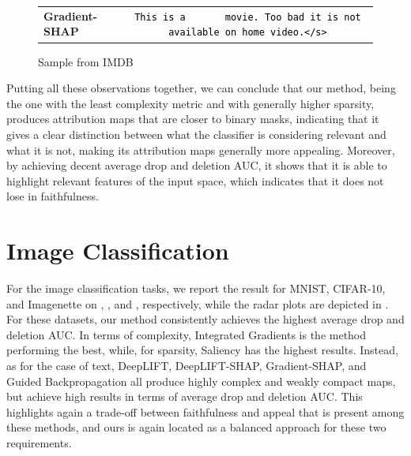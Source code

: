 \begin{figure}[t!]
{\begin{tabular}{lc}
    \textbf{Gradient-SHAP} & {\tt\colorbox[RGB]{251, 139, 88}{\textcolor{black}{\vphantom{Tg}This}} \colorbox[RGB]{254, 232, 200}{\textcolor{black}{\vphantom{Tg}is}} \colorbox[RGB]{253, 187, 133}{\textcolor{black}{\vphantom{Tg}a}} \colorbox[RGB]{127, 0, 0}{\textcolor{white}{\vphantom{Tg}great}} \colorbox[RGB]{217, 52, 34}{\textcolor{black}{\vphantom{Tg}movie.}} \colorbox[RGB]{248, 129, 84}{\textcolor{black}{\vphantom{Tg}Too}} \colorbox[RGB]{255, 247, 236}{\textcolor{black}{\vphantom{Tg}bad}} \colorbox[RGB]{253, 173, 119}{\textcolor{black}{\vphantom{Tg}it}} \colorbox[RGB]{253, 200, 146}{\textcolor{black}{\vphantom{Tg}is}} \colorbox[RGB]{253, 216, 167}{\textcolor{black}{\vphantom{Tg}not}} \colorbox[RGB]{244, 117, 79}{\textcolor{black}{\vphantom{Tg}available}} \colorbox[RGB]{245, 119, 80}{\textcolor{black}{\vphantom{Tg}on}} \colorbox[RGB]{244, 118, 79}{\textcolor{black}{\vphantom{Tg}home}} \colorbox[RGB]{253, 217, 170}{\textcolor{black}{\vphantom{Tg}video.</s>}}}\\
    \end{tabular}
    }
    \caption{Sample from IMDB} \label{fig:imdb_sample}
\end{figure}

Putting all these observations together, we can conclude that our method, being the one with the least complexity metric and with generally higher sparsity, produces attribution maps that are closer to binary masks, indicating that it gives a clear distinction between what the classifier is considering relevant and what it is not, making its attribution maps generally more appealing. Moreover, by achieving decent average drop and deletion AUC, it shows that it is able to highlight relevant features of the input space, which indicates that it does not lose in faithfulness.



\section{Image Classification}
For the image classification tasks, we report the result for MNIST, CIFAR-10, and Imagenette on , , and , respectively, while the radar plots are depicted in . For these datasets, our method consistently achieves the highest average drop and deletion AUC. In terms of complexity, Integrated Gradients is the method performing the best, while, for sparsity, Saliency has the highest results. Instead, as for the case of text, DeepLIFT, DeepLIFT-SHAP, Gradient-SHAP, and Guided Backpropagation all produce highly complex and weakly compact maps, but achieve high results in terms of average drop and deletion AUC. This highlights again a trade-off between faithfulness and appeal that is present among these methods, and ours is again located as a balanced approach for these two requirements.

